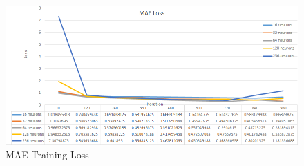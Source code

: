 \documentclass[draft,dvipsnames]{drexel-thesis}
\begin{document}
\begin{thesis}
\begin{figure}[t!]
    \centering
    \includegraphics[width=\textwidth]{pictures/result_pictures/MAE_Loss.png}
    \caption{MAE Training Loss}
    \label{fig:mae_loss}
\end{figure}


\end{thesis}
\end{document}

